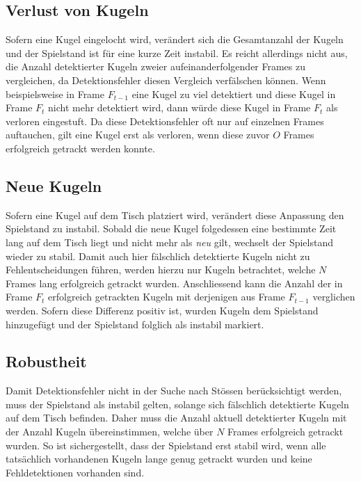 \subsection{Verlust von Kugeln}
Sofern eine Kugel eingelocht wird, verändert sich die Gesamtanzahl der Kugeln und der Spielstand ist für eine kurze Zeit instabil.
Es reicht allerdings nicht aus, die Anzahl detektierter Kugeln zweier aufeinanderfolgender Frames zu vergleichen,
da Detektionsfehler diesen Vergleich verfälschen können.
Wenn beispielsweise in Frame $F_{t-1}$ eine Kugel zu viel detektiert und diese Kugel in Frame $F_{t}$ nicht mehr
detektiert wird, dann würde diese Kugel in Frame $F_{t}$ als verloren eingestuft.
Da diese Detektionsfehler oft nur auf einzelnen Frames auftauchen, gilt eine Kugel erst als verloren, wenn diese zuvor
$O$ Frames erfolgreich getrackt werden konnte.

\subsection{Neue Kugeln}
Sofern eine Kugel auf dem Tisch platziert wird, verändert diese Anpassung den Spielstand zu instabil.
Sobald die neue Kugel folgedessen eine bestimmte Zeit lang auf dem Tisch liegt und nicht mehr als \emph{neu} gilt,
wechselt der Spielstand wieder zu stabil.
Damit auch hier fälschlich detektierte Kugeln nicht zu Fehlentscheidungen führen, werden hierzu nur Kugeln
betrachtet, welche $N$ Frames lang erfolgreich getrackt wurden.
Anschliessend kann die Anzahl der in Frame $F_{t}$ erfolgreich getrackten Kugeln mit derjenigen aus Frame $F_{t-1}$
verglichen werden.
Sofern diese Differenz positiv ist, wurden Kugeln dem Spielstand hinzugefügt und der Spielstand folglich als instabil markiert.

\subsection{Robustheit}
Damit Detektionsfehler nicht in der Suche nach Stössen berücksichtigt werden, muss der Spielstand als instabil gelten,
solange sich fälschlich detektierte Kugeln auf dem Tisch befinden.
Daher muss die Anzahl aktuell detektierter Kugeln mit der Anzahl Kugeln übereinstimmen, welche über $N$ Frames erfolgreich
getrackt wurden.
So ist sichergestellt, dass der Spielstand erst stabil wird, wenn alle tatsächlich vorhandenen Kugeln lange genug
getrackt wurden und keine Fehldetektionen vorhanden sind.

